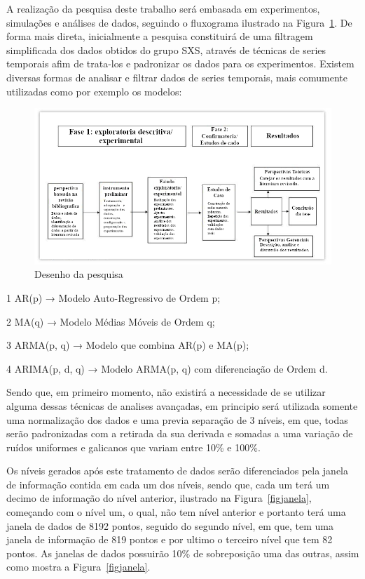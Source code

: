 A realização da pesquisa deste trabalho será embasada em experimentos, simulações e análises de dados, seguindo o fluxograma ilustrado na Figura~\ref{figpesquisa}. De forma mais direta, inicialmente a pesquisa constituirá de uma filtragem simplificada dos dados obtidos do grupo SXS, através de técnicas de series temporais afim de trata-los e padronizar os dados para os experimentos. Existem diversas formas de analisar e filtrar dados de series temporais, mais comumente utilizadas como por exemplo os modelos:

\begin{figure}[ht]
\centering
\includegraphics[width=1\textwidth]{figuras/desenho_da_pesquisa.png}
\caption{Desenho da pesquisa}
\label{figpesquisa}
\end{figure}

1 AR(p) → Modelo Auto-Regressivo de Ordem p;

2 MA(q) → Modelo Médias Móveis de Ordem q;

3 ARMA(p, q) → Modelo que combina AR(p) e MA(p);

4 ARIMA(p, d, q) → Modelo ARMA(p, q) com diferenciação de Ordem d.

Sendo que, em primeiro momento, não existirá a necessidade de se utilizar alguma dessas técnicas de analises avançadas, em principio será utilizada somente uma normalização dos dados e uma previa separação de 3 níveis, em que, todas serão padronizadas com a retirada da sua derivada e somadas a uma variação de ruídos uniformes e galicanos que variam entre 10\% e 100\%.

Os níveis gerados após este tratamento de dados serão diferenciados pela janela de informação contida em cada um dos níveis, sendo que, cada um terá um decimo de informação do nível anterior, ilustrado na Figura~\ref{figjanela}, começando com o nível um, o qual, não tem nível anterior e portanto terá uma janela de dados de 8192 pontos, seguido do segundo nível, em que, tem uma janela de informação de 819 pontos e por ultimo o terceiro nível que tem 82 pontos. As janelas de dados possuirão 10\% de sobreposição uma das outras, assim como mostra a Figura~\ref{figjanela}.

